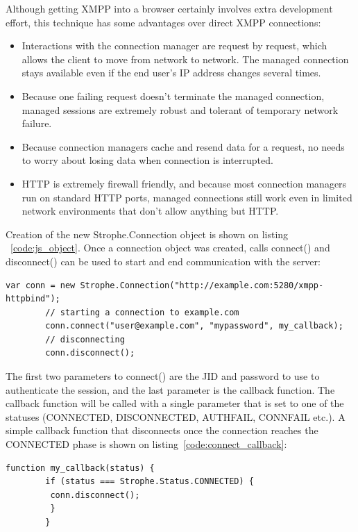 	Although getting XMPP into a browser certainly involves extra development effort, this technique has some advantages over direct XMPP connections:
	\begin{itemize}
	\item Interactions with the connection manager are request by request, which allows the client to move from network to network. The managed connection stays available even if the end user's IP address changes several times.
	\item Because one failing request doesn't terminate the managed connection, managed sessions are extremely robust and tolerant of temporary network failure.
	\item Because connection managers cache and resend data for a request, no needs to worry about losing data when connection is interrupted.
	\item HTTP is extremely firewall friendly, and because most connection managers run on standard HTTP ports, managed connections still work even in limited network environments that don’t allow anything but HTTP.
	\end{itemize}

	Creation of the new Strophe.Connection object is shown on listing ~\ref{code:js_object}. Once a connection object was created, calls connect() and disconnect() can be used to start and end communication with the server:

	    \begin{lstlisting}[label=code:js_object,caption=Stanzas Format]
		var conn = new Strophe.Connection("http://example.com:5280/xmpp-httpbind");
		// starting a connection to example.com
		conn.connect("user@example.com", "mypassword", my_callback);
		// disconnecting
		conn.disconnect();
	    \end{lstlisting}

	The first two parameters to connect() are the JID and password to use to authenticate the session, and the last parameter is the callback function. The callback function will be called with a single parameter that is set to one of the statuses (CONNECTED, DISCONNECTED, AUTHFAIL, CONNFAIL etc.). A simple callback function that disconnects once the connection reaches the CONNECTED phase is shown on listing~\ref{code:connect_callback}: 

	\begin{lstlisting}[label=code:connect_callback,caption=Stanzas Format]
		function my_callback(status) {
		if (status === Strophe.Status.CONNECTED) {
		 conn.disconnect();
		 }
	    }
	\end{lstlisting}

